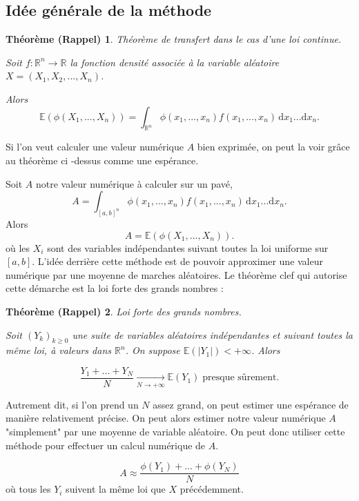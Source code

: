 \documentclass[11pt, a4paper]{article}
\newtheorem*{theo}{Théorème (Rappel)} %
\begin{document}
\subsection{Idée générale de la méthode}

\begin{theo}
    Théorème de transfert dans le cas d'une loi continue.

    Soit $f : \mathbb{R}^n \rightarrow \mathbb{R}$ la fonction densité associée à la variable
    aléatoire $X = (X_1, X_2,...,X_n)$.

    Alors\[
        \mathbb{E} \left( \phi(X_1, ..., X_n) \right) =  \int_{\mathbb{R}^n} \phi(x_1,...,x_n)f(x_1,...,x_n) \, \mathrm{d}x_1...\mathrm{d}x_n.
    \]
\end{theo}

Si l'on veut calculer une valeur numérique $A$ bien exprimée, on peut la voir grâce au théorème ci
-dessus comme une espérance. 

Soit $A$ notre valeur numérique à calculer sur un pavé,
\[
  A = \int_{[a,b]^n} \phi(x_1,...,x_n)f(x_1,...,x_n) \, \mathrm{d}x_1...\mathrm{d}x_n.
\]
Alors
\[
  A = \mathbb{E} \left( \phi(X_1, ..., X_n) \right).
\]
où les $X_i$ sont des variables indépendantes suivant toutes la loi uniforme sur $[a,b]$.
\medbreak
 L'idée derrière cette méthode est de pouvoir approximer une valeur numérique par une moyenne de
 marches aléatoires. Le théorème clef qui autorise cette démarche est la loi forte des grands
 nombres :

\begin{theo}
     Loi forte des grands nombres.

    Soit $(Y_k)_{k\ge 0}$ une suite de variables aléatoires indépendantes et suivant toutes la même
    loi, à valeurs dans $\mathbb{R}^n$. On suppose $\mathbb{E}(|Y_1|) < +\infty $. Alors

    \[
        \frac{Y_1+...+Y_N}{N}\underset{N\to+\infty}{\longrightarrow}\mathbb{E}(Y_1)\; \text{presque sûrement.}
    \]
\end{theo}

Autrement dit, si l'on prend un $N$ assez grand, on peut estimer une espérance de manière
relativement précise. On peut alors estimer notre valeur numérique $A$ "simplement" par une moyenne
de variable aléatoire. On peut donc utiliser cette méthode pour effectuer un calcul numérique de
$A$.

\[
    A \approx \frac{\phi(Y_1)+...+\phi(Y_N)}{N}
\]
où tous les $Y_i$ suivent la même loi que $X$ précédemment.
\end{document}
